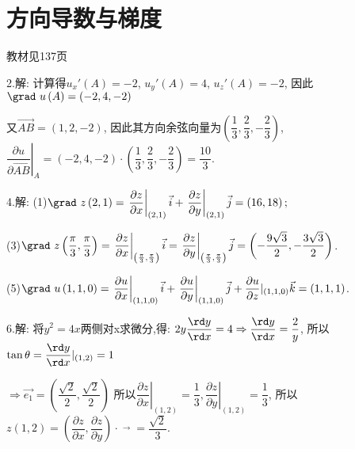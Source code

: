 \section{方向导数与梯度}
\begin{flushright}
  \color{zhanqing!80}
   教材见137页
\end{flushright}

  2.解: 计算得$u_x'\left( A \right) =  - 2$, $u_y'\left( A \right) = 4$, $u_z'\left( A \right) =  - 2$,
  因此$ \grad~u\left( A \right) = \left( { - 2,4, - 2} \right)$

  又$ \overrightarrow{AB} = \left( {1,2, - 2} \right)$,
  因此其方向余弦向量为$ \left( {\dfrac{1}{3},\dfrac{2}{3}, - \dfrac{2}{3}} \right)$,
  $\left.\dfrac{{\partial u}}{{\partial \overrightarrow{AB} }}\right|_A
  = \left( { - 2,4, - 2} \right) \cdot \left( {\dfrac{1}{3},\dfrac{2}{3}, - \dfrac{2}{3}} \right) = \dfrac{{10}}{3}$.

  4.解: (1)$\grad~z\left(2,1\right) = \left.\dfrac{{\partial z}}{{\partial x}}\right|_{\left( {2,1} \right)} \vec{i}   + \left. \dfrac{{\partial z}}{{\partial y}}\right|_{\left( {2,1} \right)} \vec{j}  = \left( {16,18} \right);$

  (3)$ \grad~z\left(\dfrac{\pi }{3},\dfrac{\pi }{3}\right)
  = \left. \dfrac{{\partial z}}{{\partial x}}\right|_{\left( {\frac{\pi }{3},\frac{\pi }{3}} \right)}\vec{i}
  = \left.\dfrac{{\partial z}}{{\partial y}}\right|_{\left( {\frac{\pi }{3},\frac{\pi }{3}} \right)}\vec{j}
  = \left( { - \dfrac{{9\sqrt 3 }}{2}, - \dfrac{{3\sqrt 3 }}{2}} \right)$.

  (5)$ \grad~u\left( {1,1,0} \right)
  = \left.\dfrac{{\partial u}}{{\partial x}}\right|_{\left( {1,1,0} \right)}\vec i + \left.\dfrac{{\partial u}}{{\partial y}}\right|_{\left( {1,1,0} \right)}\vec j + \dfrac{{\partial u}}{{\partial z}}{|_{\left( {1,1,0} \right)}}\vec k = (1,1,1)$.

  6.解: 将$ {y^2} = 4x $两侧对x求微分,得:
  $ 2y\dfrac{{\rd y}}{{\rd x}} = 4 \Rightarrow \dfrac{{\rd y}}{{\rd x}} = \dfrac{2}{y}$,
  所以$  \tan \theta  = \dfrac{{\rd y}}{{\rd x}}{|_{\left( {1,2} \right)}} = 1$

  $\Rightarrow \overrightarrow{e_1}  = \left( {\dfrac{{\sqrt 2 }}{2},\dfrac{{\sqrt 2 }}{2}} \right)$
  所以$\left. \dfrac{{\partial z}}{{\partial x}}\right|_{\left( {1,2} \right)}
  = \left. \dfrac{1}{3},\dfrac{{\partial z}}{{\partial y}}\right|_{\left( {1,2} \right)} = \dfrac{1}{3}$,
  所以$ z\left( {1,2} \right) = \left( {\dfrac{{\partial z}}{{\partial x}},\dfrac{{\partial z}}{{\partial y}}} \right) \cdot \mathop {{e_1}}\limits^ \to   = \dfrac{{\sqrt 2 }}{3}$.

